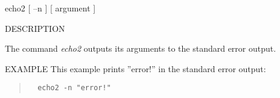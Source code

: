 
\begin{synopsis}
\item[echo2] [ --n ] [ argument ]
\end{synopsis}

\begin{qsection}{DESCRIPTION}

The command {\em echo2} outputs its arguments to the standard error
output.

\end{qsection}

\begin{options}
\end{options}

\begin{qsection}{EXAMPLE}
This example prints ''error!'' in the standard error output:
\begin{quote}
  \begin{verbatim}
  echo2 -n "error!"
  \end{verbatim}
\end{quote}
\end{qsection}
